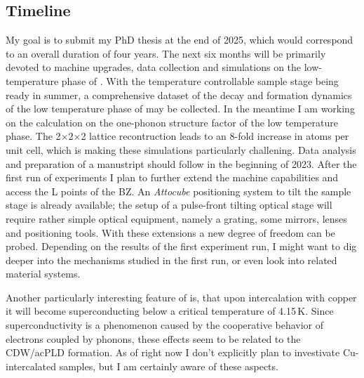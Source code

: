 \subsection*{Timeline}
My goal is to submit my PhD thesis at the end of 2025, which would correspond to an overall duration of four years.
The next six months will be primarily devoted to machine upgrades, data collection and simulations on the low-temperature phase of \ts.
With the temperature controllable sample stage being ready in summer, a comprehensive dataset of the decay and formation dynamics of the low temperature phase of \ts may be collected.
In the meantime I am working on the calculation on the one-phonon structure factor of the low temperature phase.
The 2$\times$2$\times$2 lattice recontruction leads to an 8-fold increase in atoms per unit cell, which is making these simulations particularly challening.
Data analysis and preparation of a manustript should follow in the beginning of 2023.
After the first run of experiments I plan to further extend the machine capabilities and access the L points of the \ac{BZ}.
An \emph{Attocube} positioning system to tilt the sample stage is already available; the setup of a pulse-front tilting optical stage will require rather simple optical equipment, namely a grating, some mirrors, lenses and positioning tools.
With these extensions a new degree of freedom can be probed.
Depending on the results of the first experiment run, I might want to dig deeper into the mechanisms studied in the first run, or even look into related material systems.

Another particularly interesting feature of \ts\space is, that upon intercalation with copper it will become superconducting below a critical temperature of 4.15\,K\cite{morosan2006}.
Since superconductivity is a phenomenon caused by the cooperative behavior of electrons coupled by phonons, these effects seem to be related to the \ac{CDW}/ac{PLD} formation.
As of right now I don't explicitly plan to investivate Cu-intercalated samples, but I am certainly aware of these aspects.

